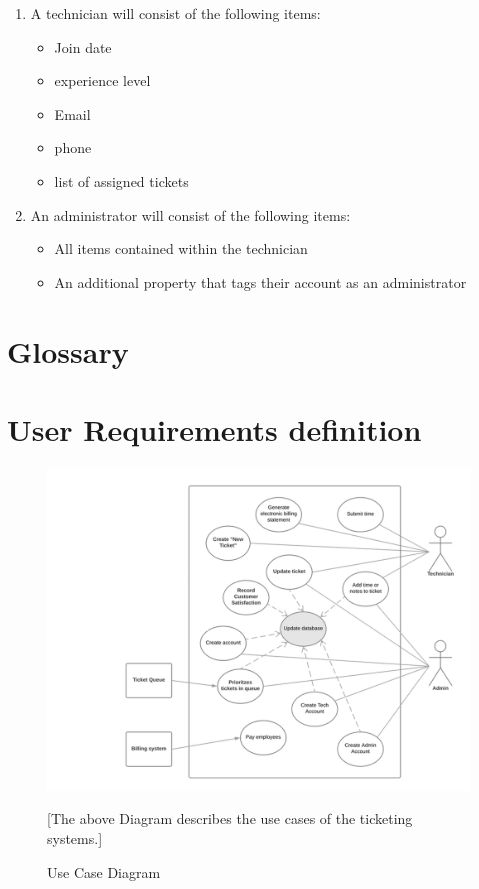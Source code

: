 \documentclass[letterpaper]{article}
\begin{document}
\begin{enumerate}
  \item A  technician will consist of the following items:
        \begin{itemize}
          \item Join date
          \item experience level
          \item Email
          \item phone
          \item list of assigned tickets
        \end{itemize}
  \item An  administrator will consist of the following items:
        \begin{itemize}
          \item All items contained within the technician 
          \item An additional property that tags their account as an administrator
        \end{itemize}
\end{enumerate}
\pagebreak

\section{Glossary}
\glsaddall
\printglossaries
\pagebreak

\section{User Requirements definition}

\begin{figure}[htbp]
  \includegraphics[]{UseCase}
  \caption{Use Case Diagram}[The above Diagram describes the use cases of the ticketing systems.]
  \centering
\end{figure}
\end{document}
